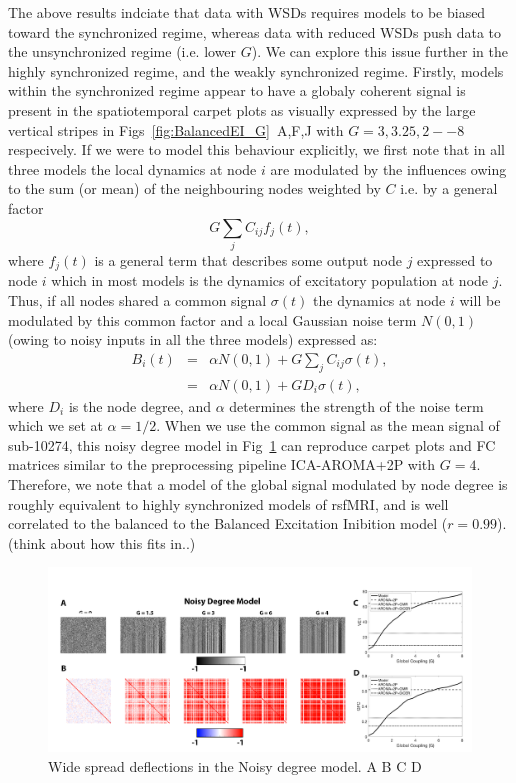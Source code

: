 \documentclass[oneside]{zHenriquesLab-StyleBioRxiv}
\begin{document}
The above results indciate that data with WSDs requires models to be biased toward the synchronized regime, whereas data with reduced WSDs push data to the unsynchronized regime (i.e. lower $G$). We can explore this issue further in the highly synchronized regime, and the weakly synchronized regime. Firstly, models within the synchronized regime appear to have a globaly coherent signal is present in the spatiotemporal carpet plots as visually expressed by the large vertical stripes in Figs~\ref{fig:BalancedEI_G}~A,F,J with $G=3,3.25,2--8$ respecively. If we were to model this behaviour explicitly, we first note that in all three models the local dynamics at node $i$ are modulated by the influences owing to the sum (or mean) of the neighbouring nodes weighted by $C$ i.e. by a general factor
\begin{equation}
G\sum_jC_{ij}f_{j}(t),
\end{equation}
where $f_{j}(t)$ is a general term that describes some output node $j$ expressed to node $i$ which in most models is the dynamics of excitatory population at node $j$. Thus, if all nodes shared a common signal $\sigma(t)$ the dynamics at node $i$ will be modulated by this common factor and a local Gaussian noise term $N(0,1)$ (owing to noisy inputs in all the three models) expressed as:
\begin{eqnarray}
B_i(t) &=& \alpha N(0,1) + G\sum_jC_{ij}\sigma(t),\\
	   &=& \alpha N(0,1) + GD_{i}\sigma(t),
\end{eqnarray}
where $D_i$ is the node degree, and $\alpha$ determines the strength of the noise term which we set at $\alpha=1/2$. When we use the common signal as the mean signal of sub-10274, this noisy degree model in Fig~\ref{fig:NDM_G} can reproduce carpet plots and FC matrices similar to the preprocessing pipeline ICA-AROMA+2P with $G=4$. Therefore, we note that a model of the global signal modulated by node degree is roughly equivalent to highly synchronized models of rsfMRI, and is well correlated  to the balanced to the Balanced Excitation Inibition model ($r=0.99$). (think about how this fits in..)

\begin{figure}[ht!]
\includegraphics[width=1\textwidth]{figs/NDMModel.png}
\caption{Wide spread deflections in the Noisy degree model. A B C D}\label{fig:NDM_G}
\end{figure}
\end{document}
